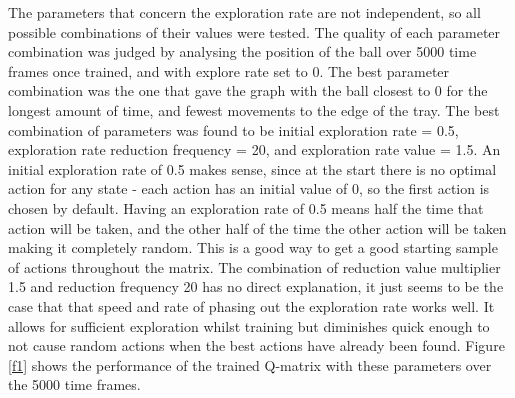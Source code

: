 \documentclass[12pt,a4paper]{article}
\begin{document}
The parameters that concern the exploration rate are not independent, so all possible combinations of their values were tested. The quality of each parameter combination was judged by analysing the position of the ball over 5000 time frames once trained, and with explore rate set to 0. The best parameter combination was the one that gave the graph with the ball closest to 0 for the longest amount of time, and fewest movements to the edge of the tray. The best combination of parameters was found to be initial exploration rate = 0.5, exploration rate reduction frequency = 20, and exploration rate value = 1.5. An initial exploration rate of 0.5 makes sense, since at the start there is no optimal action for any state - each action has an initial value of 0, so the first action is chosen by default. Having an exploration rate of 0.5 means half the time that action will be taken, and the other half of the time the other action will be taken making it completely random. This is a good way to get a good starting sample of actions throughout the matrix. The combination of reduction value multiplier 1.5 and reduction frequency 20 has no direct explanation, it just seems to be the case that that speed and rate of phasing out the exploration rate works well. It allows for sufficient exploration whilst training but diminishes quick enough to not cause random actions when the best actions have already been found. Figure \ref{f1} shows the performance of the trained Q-matrix with these parameters over the 5000 time frames.
\end{document}
